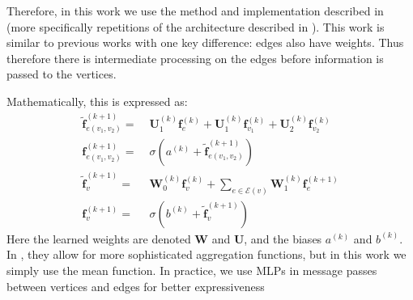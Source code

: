 \documentclass[10pt,twocolumn,letterpaper]{article}
\newcommand{\mat}[1]{\mathbf{#1}}
\begin{document}
Therefore, in this work we use the method and implementation described in \cite{battaglia2018relational} (more specifically repetitions of the architecture described in \cite{battaglia2016interaction}).
This work is similar to previous works with one key difference: edges also have weights.
Thus therefore there is intermediate processing on the edges before information is passed to the vertices. 

Mathematically, this is expressed as: %
\begin{align}
\mat{\tilde{f}}_{e(v_1,v_2)}^{(k+1)} =&\; \mat{U}_1^{(k)} \mat{f}_{e}^{(k)} + \mat{U}_1^{(k)} \mat{f}_{v_1}^{(k)} + \mat{U}_2^{(k)} \mat{f}_{v_2}^{(k)} \\
\mat{f}_{e(v_1,v_2)}^{(k+1)} =&\; \sigma \left(a^{(k)} + \mat{\tilde{f}}_{e(v_1,v_2)}^{(k+1)}\right) \\
\mat{\tilde{f}}_{v}^{(k+1)} =&\; \mat{W}_0^{(k)} \mat{f}_{v}^{(k)} + \sum_{e \in \mathcal{E}(v)} \mat{W}_1^{(k)} \mat{f}_{e}^{(k+1)} \\
\mat{f}_v^{(k+1)} =&\; \sigma\left(b^{(k)} + \mat{\tilde{f}}_v^{(k+1)}\right)
\end{align}
Here the learned weights are denoted $\mat{W}$ and $\mat{U}$, and the biases $a^{(k)}$ and  $b^{(k)}$.
In \cite{battaglia2018relational}, they allow for more sophisticated aggregation functions, but in this work we simply use the mean function.
In practice, we use MLPs in message passes between vertices and edges for better expressiveness
\end{document}
